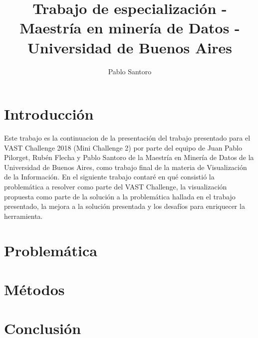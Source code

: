 \documentclass[a4paper, twopager]{article}
\author{Pablo Santoro}
\title{Trabajo de especialización - Maestría en minería de Datos - Universidad de Buenos Aires}
\begin{document}
\maketitle
\newpage
\tableofcontents
\newpage
\section{Introducción}
Este trabajo es la continuacion de la presentación del trabajo presentado para el VAST Challenge 2018 (Mini Challenge 2) por parte del equipo de Juan Pablo Pilorget, Rubén Flecha y Pablo Santoro de la Maestría en Minería de Datos de la Universidad de Buenos Aires, como trabajo final de la materia de Visualización de la Información. En el siguiente trabajo contaré en qué consistió la problemática a resolver como parte del VAST Challenge, la visualización propuesta como parte de la solución a la problemática hallada en el trabajo presentado, la mejora a la solución presentada y los desafíos para enriquecer la herramienta.
\section{Problemática}
\section{Métodos}
\section{Conclusión}
\end{document}
